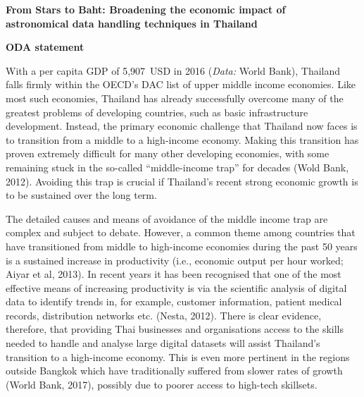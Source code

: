 \documentclass[11pt]{article}
\begin{document}
\setcounter{figure}{0}
\noindent
{\LARGE \bf From Stars to Baht: Broadening the economic impact of \\
astronomical data handling techniques in Thailand}

\vspace{5mm}

\noindent
{\Large \bf ODA statement}

\vspace{2mm}

\noindent
With a per capita GDP of 5,907~USD in 2016 ({\it Data:} World Bank), Thailand falls firmly within the OECD's DAC list of upper middle income economies. Like most such economies, Thailand has already successfully overcome many of the greatest problems of developing countries, such as basic infrastructure development. Instead, the primary economic challenge that Thailand now faces is to transition from a middle to a high-income economy. Making this transition has proven extremely difficult for many other developing economies, with some remaining stuck in the so-called ``middle-income trap'' for decades (Wold Bank, 2012). Avoiding this trap is crucial if Thailand's recent strong economic growth is to be sustained over the long term.     

\vspace{2mm}
\noindent
The detailed causes and means of avoidance of the middle income trap are complex and subject to debate. However, a common theme among countries that have transitioned from middle to high-income economies during the past 50 years is a sustained increase in productivity (i.e., economic output per hour worked; Aiyar et al, 2013). In recent years it has been recognised that one of the most effective means of increasing productivity is via the scientific analysis of digital data to identify trends in, for example, customer information, patient medical records, distribution networks etc. (Nesta, 2012). There is clear evidence, therefore, that providing Thai businesses and organisations access to the skills needed to handle and analyse large digital datasets will assist Thailand's transition to a high-income economy. This is even more pertinent in the regions outside Bangkok which have traditionally suffered from slower rates of growth (World Bank, 2017), possibly due to poorer access to high-tech skillsets.    
\end{document}
